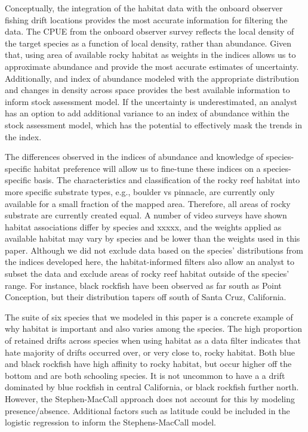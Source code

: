 \documentclass[
  12pt,
  authoryear,
  preprint,
  3p]{elsarticle}
\begin{document}
Conceptually, the integration of the habitat data with the onboard
observer fishing drift locations provides the most accurate information
for filtering the data. The CPUE from the onboard observer survey
reflects the local density of the target species as a function of local
density, rather than abundance. Given that, using area of available
rocky habitat as weights in the indices allows us to approximate
abundance and provide the most accurate estimates of uncertainty.
Additionally, and index of abundance modeled with the appropriate
distribution and changes in density across space provides the best
available information to inform stock assessment model. If the
uncertainty is underestimated, an analyst has an option to add
additional variance to an index of abundance within the stock assessment
model, which has the potential to effectively mask the trends in the
index.

The differences observed in the indices of abundance and knowledge of
species-specific habitat preference will allow us to fine-tune these
indices on a species-specific basis. The characteristics and
classification of the rocky reef habitat into more specific substrate
types, e.g., boulder vs pinnacle, are currently only available for a
small fraction of the mapped area. Therefore, all areas of rocky
substrate are currently created equal. A number of video surveys have
shown habitat associations differ by species and xxxxx, and the weights
applied as available habitat may vary by species and be lower than the
weights used in this paper. Although we did not exclude data based on
the species' distributions from the indices developed here, the
habitat-informed filters also allow an analyst to subset the data and
exclude areas of rocky reef habitat outside of the species' range. For
instance, black rockfish have been observed as far south as Point
Conception, but their distribution tapers off south of Santa Cruz,
California.

The suite of six species that we modeled in this paper is a concrete
example of why habitat is important and also varies among the species.
The high proportion of retained drifts across species when using habitat
as a data filter indicates that hate majority of drifts occurred over,
or very close to, rocky habitat. Both blue and black rockfish have high
affinity to rocky habitat, but occur higher off the bottom and are both
schooling species. It is not uncommon to have a a drift dominated by
blue rockfish in central California, or black rockfish further north.
However, the Stephen-MacCall approach does not account for this by
modeling presence/absence. Additional factors such as latitude could be
included in the logistic regression to inform the Stephens-MacCall
model.
\end{document}
